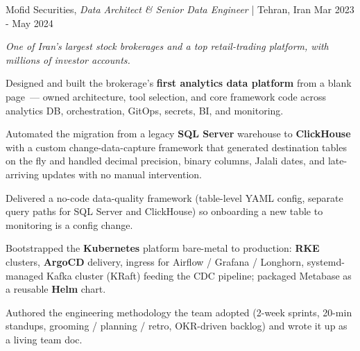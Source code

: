 \begin{cventries2}
  \cventrynew
    {Mofid Securities, \textnormal{\textit{Data Architect \& Senior Data Engineer} | Tehran, Iran}}
    {Mar 2023 - May 2024}
    {
      {\small\itshape One of Iran's largest stock brokerages and a top retail-trading platform, with millions of investor accounts.}\par\vspace{4mm}
      \begin{cvitems}
        \item Designed and built the brokerage's {\bf first analytics data platform} from a blank page~--- owned architecture, tool selection, and core framework code across analytics DB, orchestration, GitOps, secrets, BI, and monitoring.
        \item Automated the migration from a legacy {\bf SQL Server} warehouse to {\bf ClickHouse} with a custom change-data-capture framework that generated destination tables on the fly and handled decimal precision, binary columns, Jalali dates, and late-arriving updates with no manual intervention.
        \item Delivered a no-code data-quality framework (table-level YAML config, separate query paths for SQL Server and ClickHouse) so onboarding a new table to monitoring is a config change.
        \item Bootstrapped the {\bf Kubernetes} platform bare-metal to production: {\bf RKE} clusters, {\bf ArgoCD} delivery, ingress for Airflow / Grafana / Longhorn, systemd-managed Kafka cluster (KRaft) feeding the CDC pipeline; packaged Metabase as a reusable {\bf Helm} chart.
        \item Authored the engineering methodology the team adopted (2-week sprints, 20-min standups, grooming / planning / retro, OKR-driven backlog) and wrote it up as a living team doc.
      \end{cvitems}
    }


\end{cventries2}
